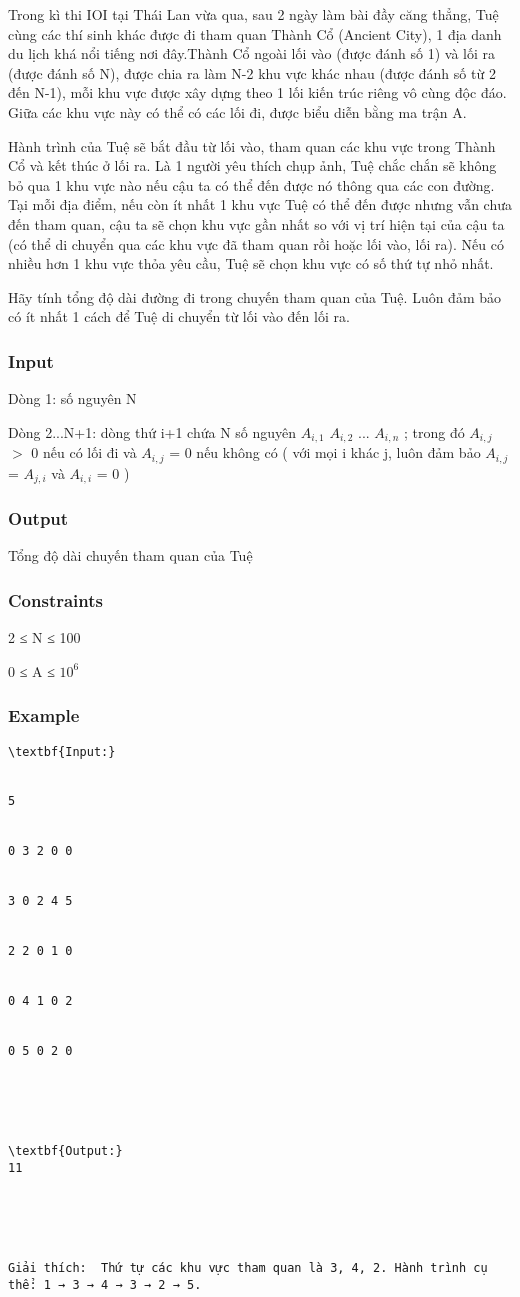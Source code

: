 



   Trong kì thi IOI tại Thái Lan vừa qua, sau 2 ngày làm bài đầy căng thẳng, Tuệ cùng các thí sinh khác được đi tham quan Thành Cổ (Ancient City), 1 địa danh du lịch khá nổi tiếng nơi đây.Thành Cổ ngoài lối vào (được đánh số 1) và lối ra (được đánh số N), được chia ra làm N-2 khu vực khác nhau (được đánh số từ 2 đến N-1), mỗi khu vực được xây dựng theo 1 lối kiến trúc riêng vô cùng độc đáo. Giữa các khu vực này có thể có các lối đi, được biểu diễn bằng ma trận A.  

   Hành trình của Tuệ sẽ bắt đầu từ lối vào, tham quan các khu vực trong Thành Cổ và kết thúc ở lối ra. Là 1 người yêu thích chụp ảnh, Tuệ chắc chắn sẽ không bỏ qua 1 khu vực nào nếu cậu ta có thể đến được nó thông qua các con đường. Tại mỗi địa điểm, nếu còn ít nhất 1 khu vực Tuệ có thể đến được nhưng vẫn chưa đến tham quan, cậu ta sẽ chọn khu vực gần nhất so với vị trí hiện tại của cậu ta (có thể di chuyển qua các khu vực đã tham quan rồi hoặc lối vào, lối ra). Nếu có nhiều hơn 1 khu vực thỏa yêu cầu, Tuệ sẽ chọn khu vực có số thứ tự nhỏ nhất.  

   Hãy tính tổng độ dài đường đi trong chuyến tham quan của Tuệ. Luôn đảm bảo có ít nhất 1 cách để Tuệ di chuyển từ lối vào đến lối ra.  

\subsubsection{   Input  }

   Dòng 1: số nguyên N   


   Dòng 2...N+1: dòng thứ i+1 chứa N số nguyên $A_{i,1}$   $A_{i,2}$   ... $A_{i,n}$   ; trong đó $A_{i,j}$   $>$ 0 nếu có lối đi và $A_{i,j}$   = 0 nếu không có ( với mọi i khác j, luôn đảm bảo $A_{i,j}$   = $A_{j,i}$   và $A_{i,i}$   = 0 )  

\subsubsection{   Output  }

   Tổng độ dài chuyến tham quan của Tuệ  

\subsubsection{   Constraints  }

   2 ≤ N ≤ 100   


   0 ≤ A ≤ $10^{6}$

\subsubsection{   Example  }
\begin{verbatim}
\textbf{Input:}


5


0 3 2 0 0


3 0 2 4 5


2 2 0 1 0


0 4 1 0 2


0 5 0 2 0





\textbf{Output:}
11





Giải thích:  Thứ tự các khu vực tham quan là 3, 4, 2. Hành trình cụ thể: 1 → 3 → 4 → 3 → 2 → 5.\end{verbatim}
